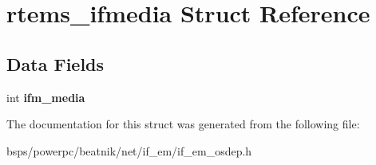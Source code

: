 \hypertarget{structrtems__ifmedia}{}\section{rtems\+\_\+ifmedia Struct Reference}
\label{structrtems__ifmedia}
\subsection*{Data Fields}
\begin{DoxyCompactItemize}
\item 
\mbox{\label{structrtems__ifmedia_a1b634874f1440e614434b1cd68bce6c0}} 
int {\bfseries ifm\+\_\+media}
\end{DoxyCompactItemize}


The documentation for this struct was generated from the following file\+:\begin{DoxyCompactItemize}
\item 
bsps/powerpc/beatnik/net/if\+\_\+em/if\+\_\+em\+\_\+osdep.\+h\end{DoxyCompactItemize}

